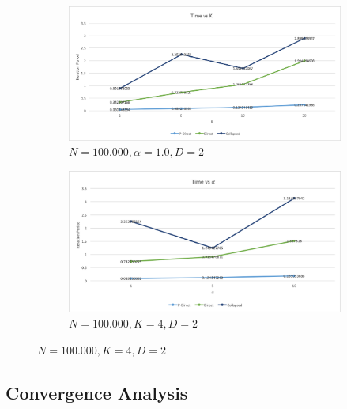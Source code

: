 \documentclass[a4paper]{article}
\begin{document}
\begin{figure}[H]
  \begin{subfigure}[t]{.4\textwidth}
    \centering
    \includegraphics[width=\linewidth]{img/N100000KVKValpha1D2.png}
    \caption{$N=100.000, \alpha=1.0, D=2$}
  \end{subfigure}
  \hfill
  \begin{subfigure}[t]{.4\textwidth}
    \centering
    \includegraphics[width=\linewidth]{img/N100000K5K5alphaVD2.png}
     \caption{$N=100.000, K=4, D=2$}
  \end{subfigure}
\end{figure}



\subsection{Convergence Analysis}


\end{document}
